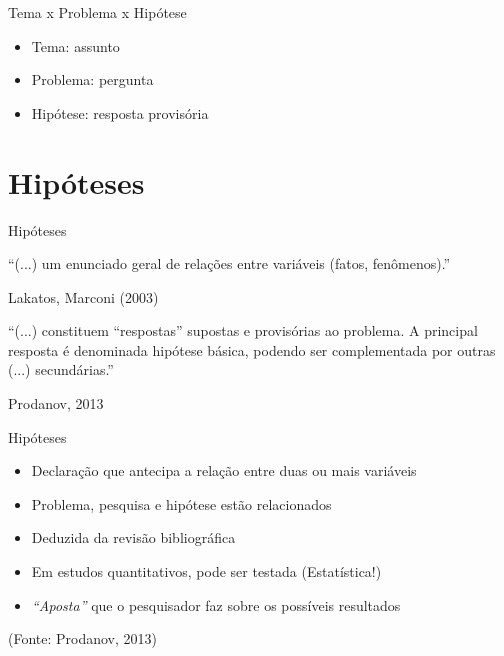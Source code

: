 \documentclass{beamer}
\begin{document}
\begin{frame}{Tema x Problema x Hipótese}
  \begin{itemize}
    \footnotesize
  \item Tema: assunto
    \bigskip
  \item Problema: pergunta
    \bigskip
  \item Hipótese: resposta provisória
  \end{itemize}
\end{frame}

\section{Hipóteses}


\begin{frame}{Hipóteses}
  \begin{block}{}
    ``(...) um enunciado geral de \alert{relações entre variáveis}
    (fatos, fenômenos).''

    \vfill
    \scriptsize
    \hfill Lakatos, Marconi (2003)
  \end{block}
  \begin{block}{}
    ``(...) constituem ``respostas'' supostas e provisórias ao
    problema. A principal resposta é denominada hipótese básica,
    podendo ser complementada por outras (...) secundárias.''

    \vfill
    \scriptsize
    \hfill Prodanov, 2013
  \end{block}
\end{frame}

\begin{frame}{Hipóteses}
  \begin{itemize}
    \footnotesize
  \item Declaração que antecipa a relação entre duas ou mais variáveis
    \bigskip
  \item Problema, pesquisa e hipótese estão relacionados
    \bigskip
  \item Deduzida da revisão bibliográfica
    \bigskip
  \item Em estudos quantitativos, pode ser testada (Estatística!)
    \bigskip
  \item {\em ``Aposta''} que o pesquisador faz sobre os possíveis
    resultados
  \end{itemize}

  \vfill
  \scriptsize
  \hfill (Fonte: Prodanov, 2013)
\end{frame}
\end{document}
